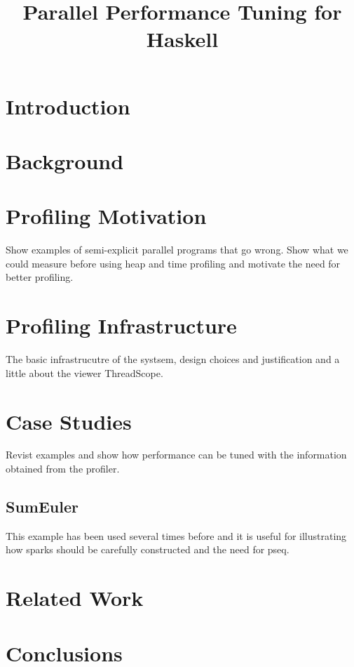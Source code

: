 \documentclass[twocolumn,9pt]{sigplanconf}
\title{Parallel Performance Tuning for Haskell}
\begin{document}
\maketitle

\begin{abstract}
\end{abstract}


\section{Introduction}

\section{Background}

\section{Profiling Motivation}
Show examples of semi-explicit parallel programs that go wrong. Show what we could measure before using heap and time profiling and motivate the need for better profiling.

\section{Profiling Infrastructure}
The basic infrastrucutre of the systsem, design choices and justification and a little about the viewer ThreadScope.

\section{Case Studies}
Revist examples and show how performance can be tuned with the information obtained from the profiler.

\subsection{SumEuler}
This example has been used several times before and it is useful for illustrating how sparks should be carefully constructed and the need for pseq.

\section{Related Work}

\section{Conclusions}



\end{document}
